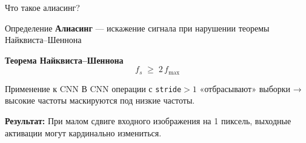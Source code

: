 \documentclass[aspectratio=169]{beamer}
\begin{document}
\begin{frame}{Что такое алиасинг?}
    \begin{block}{Определение}
        \textbf{Алиасинг} — искажение сигнала при нарушении теоремы Найквиста–Шеннона
    \end{block}

    \begin{center}
        \textbf{Теорема Найквиста–Шеннона}
        \[
            f_s \;\ge\; 2\,f_{\text{max}}
        \]
        
        \vspace{0.5cm}
        
        \begin{block}{Применение к CNN}
            В CNN операции с \texttt{stride}$>1$ «отбрасывают» выборки → высокие частоты маскируются под низкие частоты.
            
            \vspace{0.3cm}
            
            \textbf{Результат:} При малом сдвиге входного изображения на 1 пиксель, выходные активации могут кардинально измениться.
        \end{block}
    \end{center}
\end{frame}
\end{document}
